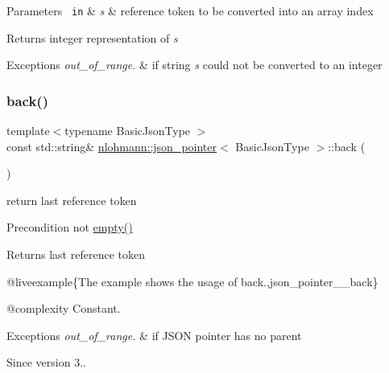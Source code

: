 \begin{DoxyParams}[1]{Parameters}
\mbox{\texttt{ in}}  & {\em s} & reference token to be converted into an array index\\
\hline
\end{DoxyParams}
\begin{DoxyReturn}{Returns}
integer representation of {\itshape s} 
\end{DoxyReturn}

\begin{DoxyExceptions}{Exceptions}
{\em out\+\_\+of\+\_\+range.} & if string {\itshape s} could not be converted to an integer \\
\hline
\end{DoxyExceptions}
\mbox{\label{classnlohmann_1_1json__pointer_a6bd5b554c10f15672135c216893eef31}} 
\subsubsection{\texorpdfstring{back()}{back()}}
{\footnotesize\ttfamily template$<$typename Basic\+Json\+Type $>$ \\
const std\+::string\& \mbox{\hyperlink{classnlohmann_1_1json__pointer}{nlohmann\+::json\+\_\+pointer}}$<$ Basic\+Json\+Type $>$\+::back (\begin{DoxyParamCaption}{ }\end{DoxyParamCaption})\hspace{0.3cm}{\ttfamily [inline]}}



return last reference token 

\begin{DoxyPrecond}{Precondition}
not {\ttfamily \mbox{\hyperlink{classnlohmann_1_1json__pointer_a649252bda4a2e75a0915b11a25d8bcc3}{empty()}}} 
\end{DoxyPrecond}
\begin{DoxyReturn}{Returns}
last reference token
\end{DoxyReturn}
@liveexample\{The example shows the usage of {\ttfamily back}.,json\+\_\+pointer\+\_\+\+\_\+back\}

@complexity Constant.


\begin{DoxyExceptions}{Exceptions}
{\em out\+\_\+of\+\_\+range.} & if J\+S\+ON pointer has no parent\\
\hline
\end{DoxyExceptions}
\begin{DoxySince}{Since}
version 3.. 
\end{DoxySince}
\mbox{\label{classnlohmann_1_1json__pointer_a90d38e45e2d3add52d824bc55da8f772}} 
